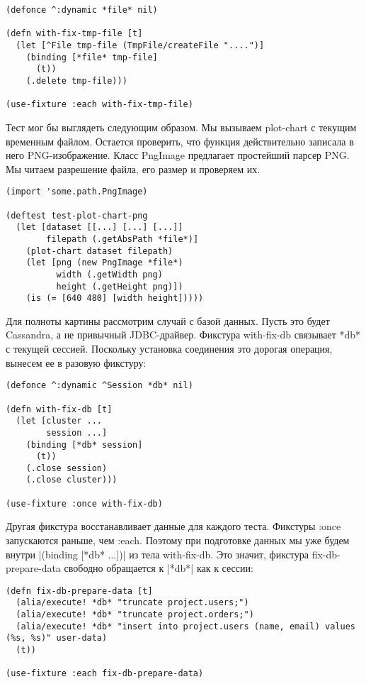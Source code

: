 \begin{verbatim}
(defonce ^:dynamic *file* nil)

(defn with-fix-tmp-file [t]
  (let [^File tmp-file (TmpFile/createFile "....")]
    (binding [*file* tmp-file]
      (t))
    (.delete tmp-file)))

(use-fixture :each with-fix-tmp-file)
\end{verbatim}

Тест мог бы выглядеть следующим образом. Мы вызываем plot-chart с текущим
временным файлом. Остается проверить, что функция действительно записала в него
PNG-изображение. Класс PngImage предлагает простейший парсер PNG. Мы читаем
разрешение файла, его размер и проверяем их.

\begin{verbatim}
(import 'some.path.PngImage)

(deftest test-plot-chart-png
  (let [dataset [[...] [...] [...]]
        filepath (.getAbsPath *file*)]
    (plot-chart dataset filepath)
    (let [png (new PngImage *file*)
          width (.getWidth png)
          height (.getHeight png)])
    (is (= [640 480] [width height]))))
\end{verbatim}

Для полноты картины рассмотрим случай с базой данных. Пусть это будет Cassandra,
а не привычный JDBC-драйвер. Фикстура with-fix-db связывает *db* с текущей
сессией. Поскольку установка соединения это дорогая операция, вынесем ее в
разовую фикстуру:

\begin{verbatim}
(defonce ^:dynamic ^Session *db* nil)

(defn with-fix-db [t]
  (let [cluster ...
        session ...]
    (binding [*db* session]
      (t))
    (.close session)
    (.close cluster)))

(use-fixture :once with-fix-db)
\end{verbatim}

Другая фикстура восстанавливает данные для каждого теста. Фикстуры :once
запускаются раньше, чем :each. Поэтому при подготовке данных мы уже будем внутри
\spverb|(binding [*db* ...])| из тела with-fix-db. Это значит, фикстура
fix-db-prepare-data свободно обращается к \spverb|*db*| как к сессии:

\begin{verbatim}
(defn fix-db-prepare-data [t]
  (alia/execute! *db* "truncate project.users;")
  (alia/execute! *db* "truncate project.orders;")
  (alia/execute! *db* "insert into project.users (name, email) values (%s, %s)" user-data)
  (t))

(use-fixture :each fix-db-prepare-data)
\end{verbatim}

